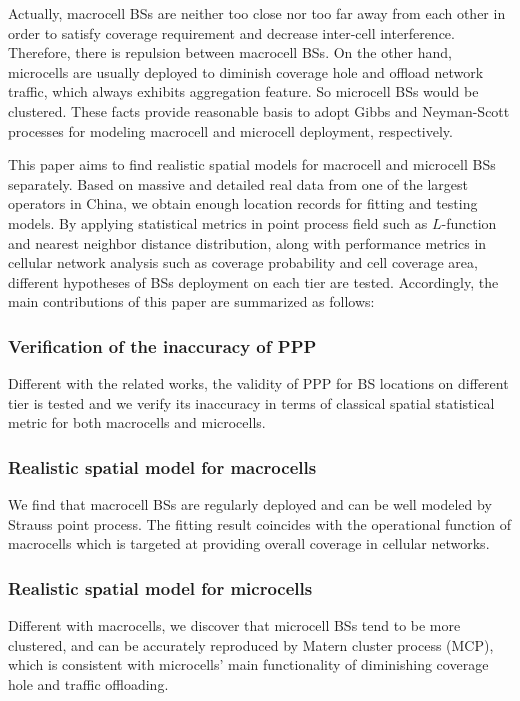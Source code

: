 \documentclass[conference]{IEEEtran}
\begin{document}
Actually, macrocell BSs are neither too close nor too far away from each other in order to satisfy coverage requirement and decrease inter-cell interference. Therefore, there is repulsion between macrocell BSs. On the other hand, microcells are usually deployed to diminish coverage hole and offload network traffic, which always exhibits aggregation feature. So microcell BSs would be clustered. These facts provide reasonable basis to adopt Gibbs and Neyman-Scott processes\cite{chiu2013stochastic} for modeling macrocell and microcell deployment, respectively.

This paper aims to find realistic spatial models for macrocell and microcell BSs separately. Based on massive and detailed real data from one of the largest operators in China, we obtain enough location records for fitting and testing models. By applying statistical metrics in point process field such as $L$-function and nearest neighbor distance distribution\cite{ripley1991statistical}, along with performance metrics in cellular network analysis such as coverage probability and cell coverage area, different hypotheses of BSs deployment on each tier are tested. Accordingly, the main contributions of this paper are summarized as follows:
\subsubsection{\bf{Verification of the inaccuracy of PPP}}
Different with the related works, the validity of PPP for BS locations on different tier is tested and we verify its inaccuracy in terms of classical spatial statistical metric for both macrocells and microcells.
\subsubsection{\bf{Realistic spatial model for macrocells}}
We find that macrocell BSs are regularly deployed and can be well modeled by Strauss point process. The fitting result coincides with the operational function of macrocells which is targeted at providing overall coverage in cellular networks.
\subsubsection{\bf{Realistic spatial model for microcells}}
Different with macrocells, we discover that microcell BSs tend to be more clustered, and can be accurately reproduced by Matern cluster process (MCP), which is consistent with microcells' main functionality of diminishing coverage hole and traffic offloading.
\end{document}
